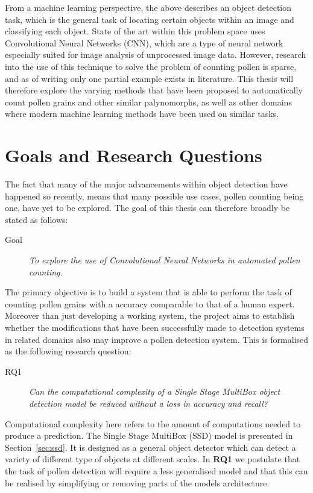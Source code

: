 From a machine learning perspective, the above describes an object detection task, which is the general task of locating certain objects within an image and classifying each object.
State of the art within this problem space uses Convolutional Neural Networks (CNN), which are a type of neural network especially suited for image analysis of unprocessed image data.
However, research into the use of this technique to solve the problem of counting pollen is sparse, and as of writing only one partial example exists in literature.
This thesis will therefore explore the varying methods that have been proposed to automatically count pollen grains and other similar palynomorphs, as well as other domains where modern machine learning methods have been used on similar tasks.

\section{Goals and Research Questions}\label{sec:Goals and Research Questions}
The fact that many of the major advancements within object detection have happened so recently, means that many possible use cases, pollen counting being one, have yet to be explored.
The goal of this thesis can therefore broadly be stated as follows:

\begin{description}
\item[Goal] \textit{To explore the use of Convolutional Neural Networks in automated pollen counting.}
\end{description}

The primary objective is to build a system that is able to perform the task of counting pollen grains with a accuracy comparable to that of a human expert.
Moreover than just developing a working system, the project aims to establish whether the modifications that have been successfully made to detection systems in related domains also may improve a pollen detection system.
This is formalised as the following research question: 

\begin{description}
\item[RQ1] \textit{Can the computational complexity of a Single Stage MultiBox object detection model be reduced without a loss in accuracy and recall?}
\end{description}

Computational complexity here refers to the amount of computations needed to produce a prediction.
The Single Stage MultiBox (SSD) model is presented in Section~\ref{sec:ssd}.
It is designed as a general object detector which can detect a variety of different type of objects at different scales.
In \textbf{RQ1} we postulate that the task of pollen detection will require a less generalised model and that this can be realised by simplifying or removing parts of the models architecture.
 
